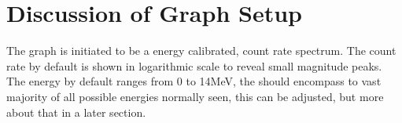 \section{Discussion of Graph Setup}
The graph is initiated to be a energy calibrated, count rate spectrum. The count rate by default is shown in logarithmic scale to reveal small magnitude peaks. The energy by default ranges from 0 to 14MeV, the should encompass to vast majority of all possible energies normally seen, this can be adjusted, but more about that in a later section. 

